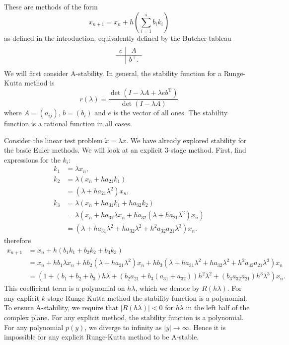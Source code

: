 These are methods of the form
\begin{equation*}
	x_{n+1} = x_n + h \left( \sum_{i = 1}^{s} b_i k_i \right)
\end{equation*}
as defined in the introduction, equivalently defined by the Butcher tableau
\begin{equation*}
	\begin{array}{c|ccc}
		c &A \\
		\hline
		&b^\top .
	\end{array}
\end{equation*}
We will first consider A-stability.
In general, the stability function for a Runge-Kutta method \cite{iserles2009rk} is
\begin{equation*}
	r(\lambda) = \frac{\det(I - \lambda A + \lambda eb^\mathrm{T})}{\det(I - \lambda A)}
\end{equation*}
where $A = (a_{ij})$, $b = (b_i)$ and $e$ is the vector of all ones.
The stability function is a rational function in all cases.

Consider the linear test problem $\dot{x} = \lambda x$.
We have already explored stability for the basic Euler methods.
We will look at an explicit 3-stage method.
First, find expressions for the $k_i$:
\begin{align*}
	k_1 &= \lambda x_n, \\
	k_2 &= \lambda\left( x_n + h a_{21}k_1 \right) \\
	&= \left( \lambda + h a_{21}\lambda^2 \right)x_n, \\
	k_3 &= \lambda \left( x_n + h a_{31}k_1 + h a_{32}k_2 \right) \\
	&= \lambda \left( x_n + h a_{31} \lambda x_n + h a_{32}\left( \lambda + h a_{21} \lambda^2 \right) x_n \right) \\
	&= \left( \lambda + h a_{31}\lambda^2 + h a_{32}\lambda^2 + h^2 a_{32}a_{21}\lambda^3 \right) x_n.
\end{align*}
therefore
\begin{align*}
	x_{n+1} &= x_n + h \left( b_1 k_1 + b_2 k_2 + b_3 k_3 \right) \\
	&= x_n + h b_1 \lambda x_n + h b_2 \left(\lambda + h a_{21} \lambda^2\right)x_n + hb_3 \left( \lambda + h a_{31} \lambda^2 + h a_{32} \lambda ^2 + h^2 a_{32} a_{21} \lambda^3\right)x_n \\
	&= \left(
		1 + \left( b_1 + b_2 + b_3 \right) h\lambda + \left(
			b_2 a_{21} + b_3 (a_{31} + a_{32})
		\right)h^2\lambda^2 + \left(
			b_3 a_{32} a_{21}
		\right)h^3\lambda^3
	\right)x_n.
\end{align*}
This coefficient term is a polynomial on $h\lambda$, which we denote by $R(h\lambda)$.
For any explicit $k$-stage Runge-Kutta method the stability function is a polynomial.
To ensure A-stability, we require that $|R(h\lambda)| < 0$ for $h \lambda$ in the left half of the complex plane.
For any explicit method, the stability function is a polynomial.
For any polynomial $p(y)$, we diverge to infinity as $|y| \rightarrow \infty$.
Hence it is impossible for any explicit Runge-Kutta method to be A-stable.

